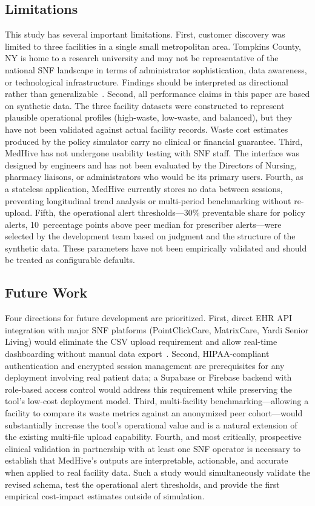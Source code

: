 \documentclass[letterpaper, 10pt, conference]{IEEEconf}
\begin{document}
\subsection{Limitations}

This study has several important limitations.
First, customer discovery was limited to three facilities in a single small
metropolitan area.
Tompkins County, NY is home to a research university and may not be
representative of the national SNF landscape in terms of administrator
sophistication, data awareness, or technological infrastructure.
Findings should be interpreted as directional rather than
generalizable~\cite{Chambers2016Assessing}.
Second, all performance claims in this paper are based on synthetic data.
The three facility datasets were constructed to represent plausible
operational profiles (high-waste, low-waste, and balanced), but they have
not been validated against actual facility records.
Waste cost estimates produced by the policy simulator carry no clinical or
financial guarantee.
Third, MedHive has not undergone usability testing with SNF staff.
The interface was designed by engineers and has not been evaluated by the
Directors of Nursing, pharmacy liaisons, or administrators who would be its
primary users.
Fourth, as a stateless application, MedHive currently stores no data between
sessions, preventing longitudinal trend analysis or multi-period benchmarking
without re-upload.
Fifth, the operational alert thresholds---30\% preventable share for policy
alerts, 10~percentage points above peer median for prescriber alerts---were
selected by the development team based on judgment and the structure of the
synthetic data.
These parameters have not been empirically validated and should be treated as
configurable defaults.

\subsection{Future Work}

Four directions for future development are prioritized.
First, direct EHR API integration with major SNF platforms (PointClickCare,
MatrixCare, Yardi Senior Living) would eliminate the CSV upload requirement
and allow real-time dashboarding without manual data export~\cite{Riester2024Use}.
Second, HIPAA-compliant authentication and encrypted session management are
prerequisites for any deployment involving real patient data; a Supabase or
Firebase backend with role-based access control would address this
requirement while preserving the tool's low-cost deployment model.
Third, multi-facility benchmarking---allowing a facility to compare its waste
metrics against an anonymized peer cohort---would substantially increase the
tool's operational value and is a natural extension of the existing
multi-file upload capability.
Fourth, and most critically, prospective clinical validation in partnership
with at least one SNF operator is necessary to establish that MedHive's
outputs are interpretable, actionable, and accurate when applied to real
facility data.
Such a study would simultaneously validate the revised schema, test the
operational alert thresholds, and provide the first empirical cost-impact
estimates outside of simulation.
\end{document}
